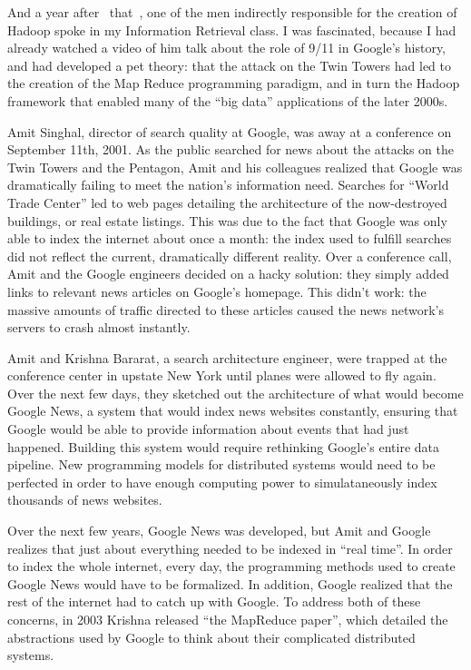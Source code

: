 \documentclass[12pt]{article}
\begin{document}
And a year after ~that~, one of the men indirectly responsible for the
creation of Hadoop spoke in my Information Retrieval class.  I was
fascinated, because I had already watched a video of him talk about the
role of 9/11 in Google's history, and had developed a pet theory: that
the attack on the Twin Towers had led to the creation of the Map Reduce
programming paradigm, and in turn the Hadoop framework that enabled many
of the ``big data'' applications of the later 2000s.

Amit Singhal, director of search quality at Google, was away at a
conference on September 11th, 2001. As the public searched for news
about the attacks on the Twin Towers and the Pentagon, Amit and his
colleagues realized that Google was dramatically failing to meet the nation's
information need. Searches for ``World Trade Center'' led to web pages
detailing the architecture of the now-destroyed buildings, or real
estate listings.  This was due to the fact that Google was only able to
index the internet about once a month: the index used to fulfill
searches did not reflect the current, dramatically different reality.
Over a conference call, Amit and the Google engineers decided on a hacky
solution: they simply added links to relevant news articles on Google's
homepage.  This didn't work: the massive amounts of traffic directed to
these articles caused the news network's servers to crash almost
instantly.

Amit and Krishna Bararat, a search architecture engineer, were trapped
at the conference center in upstate New York until planes were allowed
to fly again.  Over the next few days, they sketched out the
architecture of what would become Google News, a system that would index
news websites constantly, ensuring that Google would be able to provide
information about events that had just happened.  Building this system
would require rethinking Google's entire data pipeline.  New programming
models for distributed systems would need to be perfected in order to
have enough computing power to simulataneously index thousands of news
websites.

Over the next few years, Google News was developed, but Amit and Google
realizes that just about everything needed to be indexed in ``real time''.
In order to index the whole internet, every day, the programming methods
used to create Google News would have to be formalized.  In addition,
Google realized that the rest of the internet had to catch up with
Google.  To address both of these concerns, in 2003 Krishna released
``the MapReduce paper'', which detailed the abstractions used by Google to
think about their complicated distributed systems.  
\end{document}
